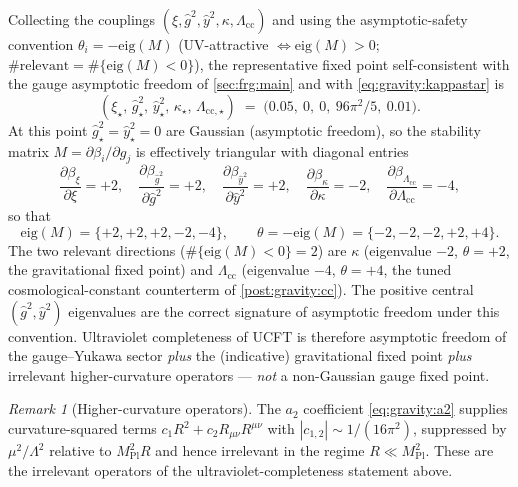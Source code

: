 \documentclass[11pt]{article}
\theoremstyle{plain}
\theoremstyle{definition}
\theoremstyle{remark}
\newtheorem{remark}[theorem]{Remark}
\begin{document}
Collecting the couplings $(\xi,\hat g^{2},\hat y^{2},\kappa,\Lambda_{\mathrm{cc}})$
and using the asymptotic-safety convention $\theta_{i}=-\mathrm{eig}(M)$
(UV-attractive $\iff \mathrm{eig}(M)>0$; $\#\text{relevant}=\#\{\mathrm{eig}(M)<0\}$),
the representative fixed point self-consistent with the gauge asymptotic
freedom of \autoref{sec:frg:main} and with \eqref{eq:gravity:kappastar} is
\begin{equation}\label{eq:gravity:FP}
  (\xi_{\star},\,\hat g^{2}_{\star},\,\hat y^{2}_{\star},\,\kappa_{\star},\,\Lambda_{\mathrm{cc},\star})
  \;=\;
  \bigl(0.05,\ 0,\ 0,\ 96\pi^{2}/5,\ 0.01\bigr).
\end{equation}
At this point $\hat g^{2}_{\star}=\hat y^{2}_{\star}=0$ are Gaussian
(asymptotic freedom), so the stability matrix $M=\partial\beta_{i}/\partial g_{j}$
is effectively triangular with diagonal entries
\begin{equation}\label{eq:gravity:stab}
  \frac{\partial\beta_{\xi}}{\partial\xi}=+2,\quad
  \frac{\partial\beta_{\hat g^{2}}}{\partial\hat g^{2}}=+2,\quad
  \frac{\partial\beta_{\hat y^{2}}}{\partial\hat y^{2}}=+2,\quad
  \frac{\partial\beta_{\kappa}}{\partial\kappa}=-2,\quad
  \frac{\partial\beta_{\Lambda_{\mathrm{cc}}}}{\partial\Lambda_{\mathrm{cc}}}=-4,
\end{equation}
so that
\begin{equation}\label{eq:gravity:eig}
  \mathrm{eig}(M)=\{+2,+2,+2,-2,-4\},
  \qquad
  \theta=-\mathrm{eig}(M)=\{-2,-2,-2,+2,+4\}.
\end{equation}
The two relevant directions ($\#\{\mathrm{eig}(M)<0\}=2$) are $\kappa$
(eigenvalue $-2$, $\theta=+2$, the gravitational fixed point) and
$\Lambda_{\mathrm{cc}}$ (eigenvalue $-4$, $\theta=+4$, the tuned
cosmological-constant counterterm of \autoref{post:gravity:cc}). The
positive central $(\hat g^{2},\hat y^{2})$ eigenvalues are the correct
signature of asymptotic freedom under this convention. Ultraviolet
completeness of UCFT is therefore asymptotic freedom of the gauge--Yukawa
sector \emph{plus} the (indicative) gravitational fixed point \emph{plus}
irrelevant higher-curvature operators --- \emph{not} a non-Gaussian gauge
fixed point.

\begin{remark}[Higher-curvature operators]
\label{rmk:gravity:higher}
The $a_{2}$ coefficient \eqref{eq:gravity:a2} supplies curvature-squared
terms $c_{1}R^{2}+c_{2}R_{\mu\nu}R^{\mu\nu}$ with
$|c_{1,2}|\sim 1/(16\pi^{2})$, suppressed by $\mu^{2}/\Lambda^{2}$ relative
to $M_{\mathrm{Pl}}^{2}R$ and hence irrelevant in the regime
$R\ll M_{\mathrm{Pl}}^{2}$. These are the irrelevant operators of the
ultraviolet-completeness statement above.
\end{remark}
\end{document}
